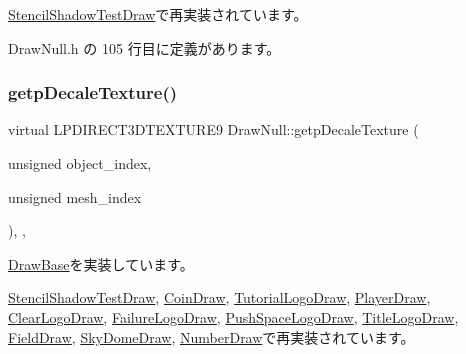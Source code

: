 \mbox{\hyperlink{class_stencil_shadow_test_draw_ad93f1c8a60a701d185108896c58dd578}{Stencil\+Shadow\+Test\+Draw}}で再実装されています。



 Draw\+Null.\+h の 105 行目に定義があります。

\mbox{\label{class_draw_null_a2dfa2d2cbb66249f933420a38e9cadad}} 
\subsubsection{\texorpdfstring{getp\+Decale\+Texture()}{getpDecaleTexture()}}
{\footnotesize\ttfamily virtual L\+P\+D\+I\+R\+E\+C\+T3\+D\+T\+E\+X\+T\+U\+R\+E9 Draw\+Null\+::getp\+Decale\+Texture (\begin{DoxyParamCaption}\item[{unsigned}]{object\+\_\+index,  }\item[{unsigned}]{mesh\+\_\+index }\end{DoxyParamCaption})\hspace{0.3cm}{\ttfamily [inline]}, {\ttfamily [override]}, {\ttfamily [virtual]}}



\mbox{\hyperlink{class_draw_base_a9f50a030778dbfca5ae45bb7908e0d58}{Draw\+Base}}を実装しています。



\mbox{\hyperlink{class_stencil_shadow_test_draw_a58f3699fa7ced20625edca807698aa85}{Stencil\+Shadow\+Test\+Draw}}, \mbox{\hyperlink{class_coin_draw_af99db1c0db2ed6b3ba429f23cd44279b}{Coin\+Draw}}, \mbox{\hyperlink{class_tutorial_logo_draw_abf06755b745dc62341a817a58d377659}{Tutorial\+Logo\+Draw}}, \mbox{\hyperlink{class_player_draw_ae69b46285241f390fbf62f6af2b5340d}{Player\+Draw}}, \mbox{\hyperlink{class_clear_logo_draw_ae67f9779fb2f9aa05d55c2167a36ddb0}{Clear\+Logo\+Draw}}, \mbox{\hyperlink{class_failure_logo_draw_a29a9642997edb92eeec83e8bd6b1ddee}{Failure\+Logo\+Draw}}, \mbox{\hyperlink{class_push_space_logo_draw_abfba58752543d8b2ccfe1e4003032dd3}{Push\+Space\+Logo\+Draw}}, \mbox{\hyperlink{class_title_logo_draw_a15ca49711182673a20439200dd8bc119}{Title\+Logo\+Draw}}, \mbox{\hyperlink{class_field_draw_a77cef7390fbe8fc68c0b325f4fcc839f}{Field\+Draw}}, \mbox{\hyperlink{class_sky_dome_draw_a99ec8e0a5aea708b66cf07c79a6449d1}{Sky\+Dome\+Draw}}, \mbox{\hyperlink{class_number_draw_a77d155c00ac4637154e62904556de05a}{Number\+Draw}}で再実装されています。



